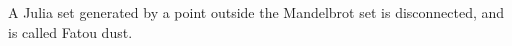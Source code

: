  A Julia set generated by a point outside the Mandelbrot
set is disconnected, and is called Fatou dust.
